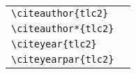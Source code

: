 \noindent
\begin{tabular}{l@{\quad$\Rightarrow$\quad}l}
  \verb|\citeauthor{tlc2}|            & \citeauthor{tlc2}            \\
  \verb|\citeauthor*{tlc2}|           & \citeauthor*{tlc2}           \\
  \verb|\citeyear{tlc2}|              & \citeyear{tlc2}              \\
  \verb|\citeyearpar{tlc2}|           & \citeyearpar{tlc2}           \\
\end{tabular}



\nocite{*}

